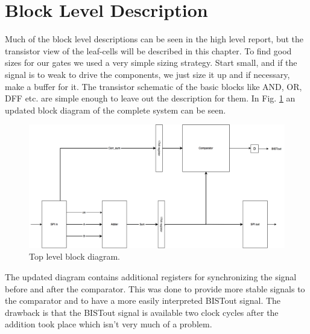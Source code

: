 \section{Block Level Description} \label{sec:block_level}
Much of the block level descriptions can be seen in the high level report, but the transistor view of the leaf-cells will be described in this chapter. To find good sizes for our gates we used a very simple sizing strategy. Start small, and if the signal is to weak to drive the components, we just size it up and if necessary, make a buffer for it. The transistor schematic of the basic blocks like AND, OR, DFF etc. are simple enough to leave out the description for them. In Fig. \ref{top} an updated block diagram of the complete system can be seen.

\begin{figure}[H]
\centering
\captionsetup{justification=centering}
\includegraphics[scale=0.175]{../figures/top_level.png}
\caption{Top level block diagram.}
\label{top}
\end{figure}

\noindent The updated diagram contains additional registers for synchronizing the signal before and after the comparator. This was done to provide more stable signals to the comparator and to have a more easily interpreted BISTout signal. The drawback is that the BISTout signal is available two clock cycles after the addition took place which isn't very much of a problem.
